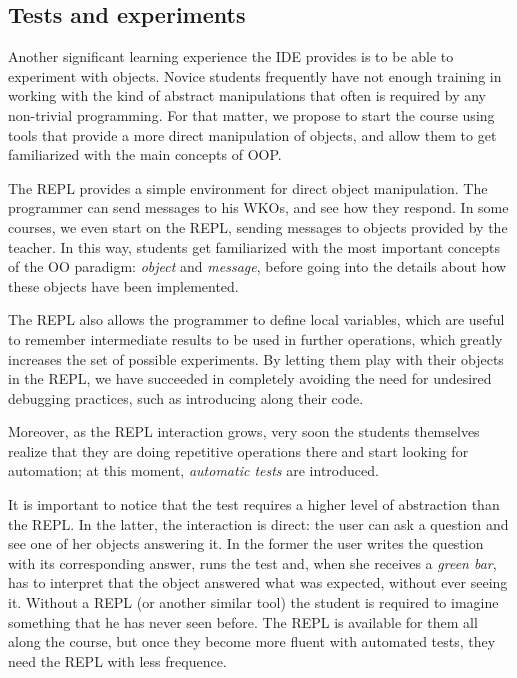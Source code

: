 \subsection{Tests and experiments}
Another significant learning experience the IDE provides is to be able to experiment with objects.
Novice students frequently have not enough training in working with the kind of abstract manipulations that often is required by any non-trivial programming.
For that matter, we propose to start the course using tools that provide a more direct manipulation of objects, and allow them to get familiarized with the main concepts of OOP.

The REPL provides a simple environment for direct object manipulation. 
The programmer can send messages to his WKOs, and see how they respond. 
In some courses, we even start on the REPL, sending messages to objects provided by the teacher.
In this way, students get familiarized with the most important concepts of the OO paradigm: \emph{object} and \emph{message}, before going into the details about how these objects have been implemented.

The REPL also allows the programmer to define local variables, which are useful to remember intermediate results to be used in further operations,
which greatly increases the set of possible experiments.
By letting them play with their objects in the REPL, we have succeeded in completely avoiding the need for undesired debugging practices, such as introducing  along their code.

\medskip

Moreover, as the REPL interaction grows, very soon the students themselves realize that they are doing repetitive operations there and start looking for automation;
at this moment, \emph{automatic tests} are introduced.

It is important to notice that the test requires a higher level of abstraction than the REPL.
In the latter, the interaction is direct: the user can ask a question and see one of her objects answering it.
In the former the user writes the question with its corresponding answer, runs the test and, when she receives a \emph{green bar}, has to interpret that the object answered what was expected, without ever seeing it.
Without a REPL (or another similar tool) the student is required to imagine something that he has never seen before. 
The REPL is available for them all along the course, but once they become more fluent with automated tests, they need the REPL with less frequence.


